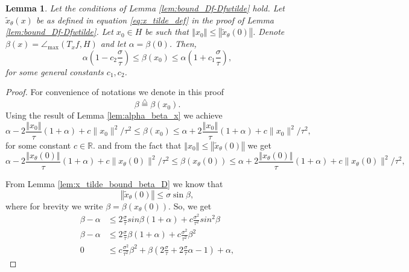 \documentclass[12pt]{article}
\newtheorem{Lemma}[Theorem]{Lemma}
\theoremstyle{remark}
\newcommand{\RR}{\mathbb{R}}
\newcommand{\defeq}{\stackrel{\bigtriangleup}{=}}
\newcommand{\norm}[1]{\left\Vert #1 \right\Vert}
\newcommand{\wtilde}[1]{\widetilde{#1}}
\newcommand{\lrbrackets}[1]{\left( #1 \right)}
\newcommand{\maxangle}{\angle_{\max}}
\begin{document}
\begin{appendices}
\begin{Lemma}\label{lem:alpha_beta_D}
Let the conditions of Lemma \ref{lem:bound_Df-Dfwtilde} hold. Let $\wtilde x_\theta(x)$ be as defined in equation \eqref{eq:x_tilde_def} in the proof of Lemma \ref{lem:bound_Df-Dfwtilde}.
Let $ x_0 \in H $ be such that $ \norm{x_0} \leq \norm{\wtilde x_\theta(0)} $.
	Denote $ \beta(x) = \maxangle(T_{x}f, H) $ and let $ \alpha = \beta(0) $.
	Then,
	\[
	\alpha\left(1  - c_2\frac{\sigma}{\tau}\right)  \leq \beta(x_0) \leq \alpha\left(1  + c_1\frac{\sigma}{\tau}\right)
	,\]
 for some general constants $c_1, c_2$.
\end{Lemma}
\begin{proof}
	For convenience of notations we denote in this proof 
	\[\beta \defeq \beta(x_0).\]
	Using the result of Lemma \ref{lem:alpha_beta_x} we achieve
     \[
      \alpha- 2\frac{\norm{x_0}}{\tau}(1 + \alpha)  +c\|x_0\|^2/\tau^2 \leq \beta(x_0) \leq \alpha+ 2\frac{\norm{x_0}}{\tau}(1 + \alpha)  +c\|x_0\|^2/\tau^2
	 ,\]
 for some constant $c\in \RR$.
	and from the fact that $ \norm{x_0} \leq \norm{\wtilde x_\theta(0)} $ we get
 \begin{equation}\label{eq:init_quadratic_ineq}
      \alpha- 2\frac{\norm{x_\theta(0)}}{\tau}(1 + \alpha)  +c\|x_\theta(0)\|^2/\tau^2 \leq \beta(x_\theta(0)) \leq \alpha+ 2\frac{\norm{x_\theta(0)}}{\tau}(1 + \alpha)  +c\|x_\theta(0)\|^2/\tau^2
	 ,
 \end{equation}

	From Lemma \ref{lem:x_tilde_bound_beta_D} we know that
	\[
	\norm{\wtilde x_\theta(0)} \leq \sigma \sin\beta
	,\]
 where for brevity we write $\beta= \beta(x_{\theta}(0))$.
	So, we get
\begin{align*}
	\beta - \alpha
	&\leq
	2\frac{\sigma}{\tau}sin\beta\lrbrackets{1+\alpha   }  + c\frac{\sigma^2}{\tau^2}sin^2\beta\\
	\beta - \alpha
	&\leq 
	2\frac{\sigma}{\tau}\beta(1+\alpha)  + c\frac{\sigma^2}{\tau^2}\beta^2
        \\
	0
	&\leq c\frac{\sigma^2}{\tau^2}\beta^2+
	\beta(2\frac{\sigma}{\tau}+2\frac{\sigma}{\tau}\alpha-1)  + \alpha
	,\end{align*}
 

\end{proof}
\end{appendices}
\end{document}
